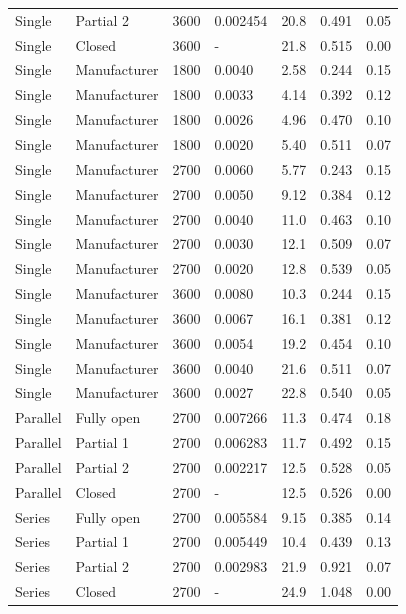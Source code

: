 \begin{longtable}{p{}p{}C{0.08\textwidth}C{0.12\textwidth}C{0.08\textwidth}C{0.12\textwidth}C{0.12\textwidth}}
    Single & Partial 2 & 3600 & 0.002454 & 20.8 & 0.491 & 0.05 \\
    Single & Closed & 3600 & - & 21.8 & 0.515 & 0.00 \\
    Single & Manufacturer & 1800 & 0.0040 & 2.58 & 0.244 & 0.15 \\
    Single & Manufacturer & 1800 & 0.0033 & 4.14 & 0.392 & 0.12 \\
    Single & Manufacturer & 1800 & 0.0026 & 4.96 & 0.470 & 0.10 \\
    Single & Manufacturer & 1800 & 0.0020 & 5.40 & 0.511 & 0.07 \\
    Single & Manufacturer & 2700 & 0.0060 & 5.77 & 0.243 & 0.15 \\
    Single & Manufacturer & 2700 & 0.0050 & 9.12 & 0.384 & 0.12 \\
    Single & Manufacturer & 2700 & 0.0040 & 11.0 & 0.463 & 0.10 \\
    Single & Manufacturer & 2700 & 0.0030 & 12.1 & 0.509 & 0.07 \\
    Single & Manufacturer & 2700 & 0.0020 & 12.8 & 0.539 & 0.05 \\
    Single & Manufacturer & 3600 & 0.0080 & 10.3 & 0.244 & 0.15 \\
    Single & Manufacturer & 3600 & 0.0067 & 16.1 & 0.381 & 0.12 \\
    Single & Manufacturer & 3600 & 0.0054 & 19.2 & 0.454 & 0.10 \\
    Single & Manufacturer & 3600 & 0.0040 & 21.6 & 0.511 & 0.07 \\
    Single & Manufacturer & 3600 & 0.0027 & 22.8 & 0.540 & 0.05 \\
    Parallel & Fully open & 2700 & 0.007266 & 11.3 & 0.474 & 0.18 \\
    Parallel & Partial 1 & 2700 & 0.006283 & 11.7 & 0.492 & 0.15 \\
    Parallel & Partial 2 & 2700 & 0.002217 & 12.5 & 0.528 & 0.05 \\
    Parallel & Closed & 2700 & - & 12.5 & 0.526 & 0.00 \\
    Series & Fully open & 2700 & 0.005584 & 9.15 & 0.385 & 0.14 \\
    Series & Partial 1 & 2700 & 0.005449 & 10.4 & 0.439 & 0.13 \\
    Series & Partial 2 & 2700 & 0.002983 & 21.9 & 0.921 & 0.07 \\
    Series & Closed & 2700 & - & 24.9 & 1.048 & 0.00 \\
    \bottomrule
\end{longtable}

